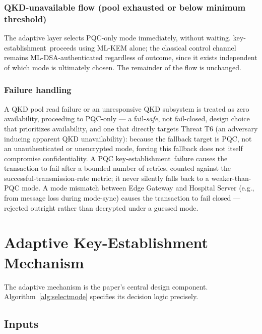 \documentclass[journal]{IEEEtran}
\newcommand{\keyest}{key-establishment}
\begin{document}
\subsubsection{QKD-unavailable flow (pool exhausted or below minimum threshold)}
The adaptive layer selects PQC-only mode immediately, without waiting. \keyest\ proceeds using ML-KEM alone; the classical control channel remains ML-DSA-authenticated regardless of outcome, since it exists independent of which mode is ultimately chosen. The remainder of the flow is unchanged.

\subsubsection{Failure handling}
A QKD pool read failure or an unresponsive QKD subsystem is treated as zero availability, proceeding to PQC-only --- a fail-\emph{safe}, not fail-closed, design choice that prioritizes availability, and one that directly targets Threat T6 (an adversary inducing apparent QKD unavailability): because the fallback target is PQC, not an unauthenticated or unencrypted mode, forcing this fallback does not itself compromise confidentiality. A PQC \keyest\ failure causes the transaction to fail after a bounded number of retries, counted against the successful-transmission-rate metric; it never silently falls back to a weaker-than-PQC mode. A mode mismatch between Edge Gateway and Hospital Server (e.g., from message loss during mode-sync) causes the transaction to fail closed --- rejected outright rather than decrypted under a guessed mode.

\section{Adaptive Key-Establishment Mechanism}
\label{sec:adaptive}

The adaptive mechanism is the paper's central design component. Algorithm~\ref{alg:selectmode} specifies its decision logic precisely.

\subsection{Inputs}
\end{document}

